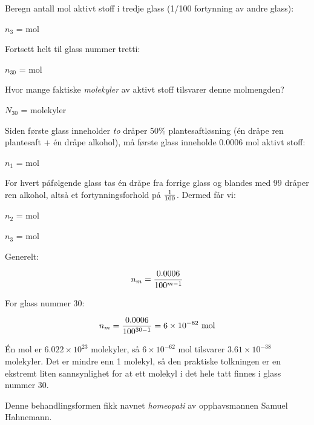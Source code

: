 \vskip 20pt

Beregn antall mol aktivt stoff i tredje glass (1/100 fortynning av andre glass):

$n_3$ = \underbar{\hskip 50pt} mol

\vskip 20pt

Fortsett helt til glass nummer tretti:

$n_{30}$ = \underbar{\hskip 50pt} mol

\vskip 20pt

Hvor mange faktiske {\it molekyler} av aktivt stoff tilsvarer denne molmengden?

$N_{30}$ = \underbar{\hskip 50pt} molekyler

\vskip 20pt







Siden første glass inneholder {\it to} dråper 50\% plantesaftløsning (én dråpe ren plantesaft + én dråpe alkohol), må første glass inneholde 0.0006 mol aktivt stoff:

\vskip 10pt

$n_1$ =  mol

\vskip 10pt

For hvert påfølgende glass tas én dråpe fra forrige glass og blandes med 99 dråper ren alkohol, altså et fortynningsforhold på $1 \over 100$. Dermed får vi:

\vskip 10pt

$n_2$ =  mol

\vskip 10pt

$n_3$ =  mol

\vskip 10pt

Generelt:

$$n_m = {0.0006 \over 100^{m-1}}$$

For glass nummer 30:

$$n_m = {0.0006 \over 100^{30-1}} = 6 \times 10^{-62} \hbox{ mol}$$

Én mol er $6.022 \times 10^{23}$ molekyler, så $6 \times 10^{-62}$ mol tilsvarer $3.61 \times 10^{-38}$ molekyler. Det er mindre enn 1 molekyl, så den praktiske tolkningen er en ekstremt liten sannsynlighet for at ett molekyl i det hele tatt finnes i glass nummer 30.







Denne behandlingsformen fikk navnet {\it homeopati} av opphavsmannen Samuel Hahnemann.



